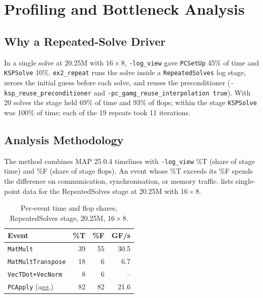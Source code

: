 \chapter{Profiling and Bottleneck Analysis}
\label{ch:profiling}

\section{Why a Repeated-Solve Driver}
\label{sec:whyrepeat}
In a single solve at 20.25M with $16\times8$, \texttt{-log\_view} gave \texttt{PCSetUp}
45\% of time and \texttt{KSPSolve} 10\%. \texttt{ex2\_repeat} runs the solve inside a
\texttt{RepeatedSolves} log stage, zeroes the initial guess before each solve, and reuses
the preconditioner (\texttt{-ksp\_reuse\_preconditioner} and
\texttt{-pc\_gamg\_reuse\_interpolation true}). With 20 solves the stage held 69\% of time and 93\% of flops; within the stage
\texttt{KSPSolve} was 100\% of time; each of the 19 repeats took 11 iterations.

\section{Analysis Methodology}
\label{sec:analysis-method}
The method combines MAP 25.0.4 timelines with \texttt{-log\_view} \%T (share of stage
time) and \%F (share of stage flops). An event whose \%T exceeds its \%F spends the
difference on communication, synchronisation, or memory traffic.  lists
single-point data for the RepeatedSolves stage at 20.25M with $16\times8$.

\begin{table}[ht]
  \centering
  \caption{Per-event time and flop shares, RepeatedSolves stage, 20.25M, $16\times8$.}
  \label{tab:tf}
  \begin{tabular}{lrrr}
    \toprule
    Event & \%T & \%F & GF/s \\
    \midrule
    \texttt{MatMult}          & 39 & 55 & 30.5 \\
    \texttt{MatMultTranspose} & 18 &  6 &  6.7 \\
    \texttt{VecTDot+VecNorm}  &  8 &  6 & --   \\
    \texttt{PCApply} (agg.)   & 82 & 82 & 21.6 \\
    \bottomrule
  \end{tabular}
\end{table}

